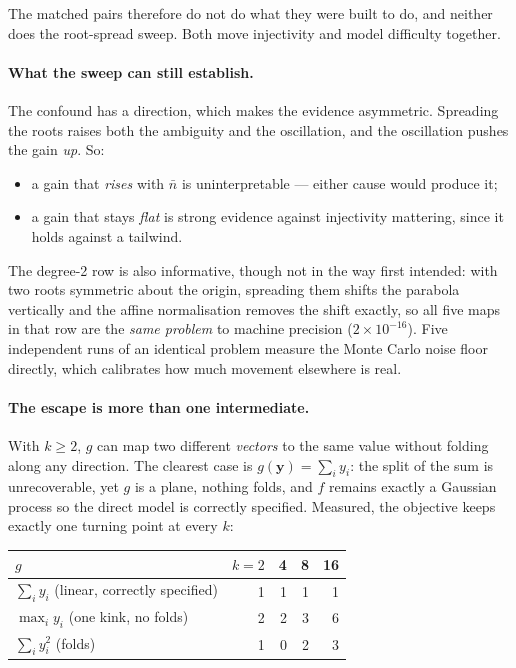 The matched pairs therefore do not do what they were built to do, and neither
does the root-spread sweep. Both move injectivity and model difficulty
together.

\paragraph{What the sweep can still establish.} The confound has a direction,
which makes the evidence asymmetric. Spreading the roots raises both the
ambiguity and the oscillation, and the oscillation pushes the gain
\emph{up}. So:

\begin{itemize}\itemsep1pt
\item a gain that \emph{rises} with $\bar n$ is uninterpretable --- either
cause would produce it;
\item a gain that stays \emph{flat} is strong evidence against injectivity
mattering, since it holds against a tailwind.
\end{itemize}

\noindent The degree-2 row is also informative, though not in the way first
intended: with two roots symmetric about the origin, spreading them shifts the
parabola vertically and the affine normalisation removes the shift exactly, so
all five maps in that row are the \emph{same problem} to machine precision
($2\times10^{-16}$). Five independent runs of an identical problem measure the
Monte Carlo noise floor directly, which calibrates how much movement elsewhere
is real.

\paragraph{The escape is more than one intermediate.} With $k\ge2$, $g$ can map
two different \emph{vectors} to the same value without folding along any
direction. The clearest case is $g(\mathbf y)=\sum_i y_i$: the split of the sum
is unrecoverable, yet $g$ is a plane, nothing folds, and $f$ remains exactly a
Gaussian process so the direct model is correctly specified. Measured, the
objective keeps exactly one turning point at every $k$:

\begin{center}
\begin{tabular}{lrrrr}
\toprule
$g$ & $k=2$ & 4 & 8 & 16 \\
\midrule
$\sum_i y_i$ \quad (linear, correctly specified) & 1 & 1 & 1 & 1 \\
$\max_i y_i$ \quad (one kink, no folds) & 2 & 2 & 3 & 6 \\
$\sum_i y_i^2$ \quad (folds) & 1 & 0 & 2 & 3 \\
\bottomrule
\end{tabular}
\end{center}

